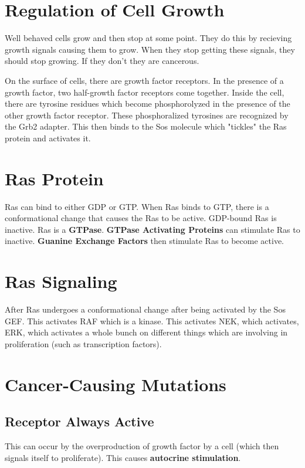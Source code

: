 \documentclass{article}
\begin{document}
\section{ Regulation of Cell Growth }

Well behaved cells grow and then stop at some point. They do this by recieving
growth signals causing them to grow. When they stop getting these signals, they
should stop growing. If they don't they are cancerous. 

On the surface of cells, there are growth factor receptors. In the presence of a
growth factor, two half-growth factor receptors come together. Inside the cell,
there are tyrosine residues which become phosphorolyzed in the presence of the
other growth factor receptor. These phosphoralized tyrosines are recognized by
the Grb2 adapter. This then binds to the Sos molecule which "tickles" the Ras
protein and activates it.

\section{ Ras Protein }

Ras can bind to either GDP or GTP. When Ras binds to GTP, there is a
conformational change that causes the Ras to be active. GDP-bound Ras is
inactive. Ras is a \textbf{GTPase}. \textbf{GTPase Activating Proteins} can
stimulate Ras to inactive. \textbf{Guanine Exchange Factors} then stimulate Ras
to become active. 

\section{ Ras Signaling }

After Ras undergoes a conformational change after being activated by the Sos
GEF. This activates RAF which is a kinase. This activates NEK, which activates,
ERK, which activates a whole bunch on different things which are involving in
proliferation (such as transcription factors).

\section{ Cancer-Causing Mutations }

\subsection{ Receptor Always Active }

This can occur by the overproduction of growth factor by a cell (which then
signals itself to proliferate). This causes \textbf{autocrine stimulation}.
\end{document}
